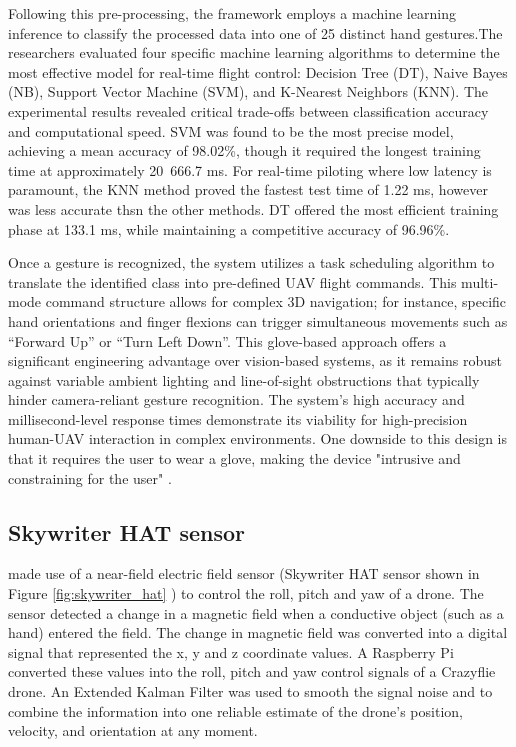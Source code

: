 Following this pre-processing, the framework employs a machine learning inference to classify the processed data into one of 25 distinct hand gestures.The researchers evaluated four specific machine learning algorithms to determine the most effective model for real-time flight control: Decision Tree (DT), Naive Bayes (NB), Support Vector Machine (SVM), and K-Nearest Neighbors (KNN). The experimental results revealed critical trade-offs between classification accuracy and computational speed. SVM was found to be the most precise model, achieving a mean accuracy of 98.02\%, though it required the longest training time at approximately 20~666.7 ms. For real-time piloting where low latency is paramount, the KNN method proved the fastest test time of 1.22 ms, however was less accurate thsn the other methods. DT offered the most efficient training phase at 133.1 ms, while maintaining a competitive accuracy of 96.96\%.

Once a gesture is recognized, the system utilizes a task scheduling algorithm to translate the identified class into pre-defined UAV flight commands. This multi-mode command structure allows for complex 3D navigation; for instance, specific hand orientations and finger flexions can trigger simultaneous movements such as ``Forward Up'' or ``Turn Left Down''. This glove-based approach offers a significant engineering advantage over vision-based systems, as it remains robust against variable ambient lighting and line-of-sight obstructions that typically hinder camera-reliant gesture recognition. The system's high accuracy and millisecond-level response times demonstrate its viability for high-precision human-UAV interaction in complex environments. One downside to this design is that it requires the user to wear a glove, making the device "intrusive and constraining for the user" \citep{Gio2021}. 

\subsection{Skywriter HAT sensor}
\cite{Mehta2023} made use of a near-field electric field sensor (Skywriter HAT sensor shown in Figure \ref{fig:skywriter_hat} \citep{Skywriter_HAT}) to control the roll, pitch and yaw of a drone. The sensor detected a change in a magnetic field when a conductive object (such as a hand) entered the field. The change in magnetic field was converted into a digital signal that represented the x, y and z coordinate values. A Raspberry Pi converted these values into the roll, pitch and yaw control signals of a Crazyflie drone. An Extended Kalman Filter was used to smooth the signal noise and to combine the information into one reliable estimate of the drone's position, velocity, and orientation at any moment.

